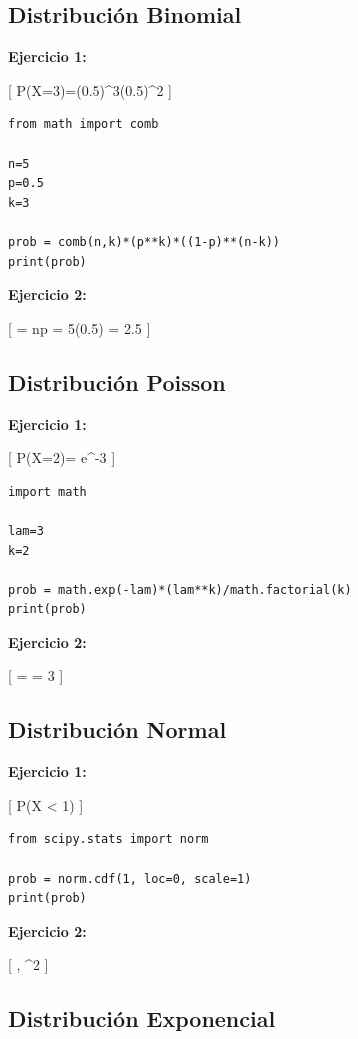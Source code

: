 \documentclass[12pt]{article}
\begin{document}
\subsection{Distribución Binomial}

\textbf{Ejercicio 1:}

[
P(X=3)=(0.5)^3(0.5)^2
]

\begin{lstlisting}
from math import comb

n=5
p=0.5
k=3

prob = comb(n,k)*(p**k)*((1-p)**(n-k))
print(prob)
\end{lstlisting}

\textbf{Ejercicio 2:}

[
\mu = np = 5(0.5) = 2.5
]

\subsection{Distribución Poisson}

\textbf{Ejercicio 1:}

[
P(X=2)= e^{-3} 
]

\begin{lstlisting}
import math

lam=3
k=2

prob = math.exp(-lam)*(lam**k)/math.factorial(k)
print(prob)
\end{lstlisting}

\textbf{Ejercicio 2:}

[
\mu = \lambda = 3
]

\subsection{Distribución Normal}

\textbf{Ejercicio 1:}

[
P(X < 1)
]

\begin{lstlisting}
from scipy.stats import norm

prob = norm.cdf(1, loc=0, scale=1)
print(prob)
\end{lstlisting}

\textbf{Ejercicio 2:}

[
\mu, \quad \sigma^2
]

\subsection{Distribución Exponencial}
\end{document}

